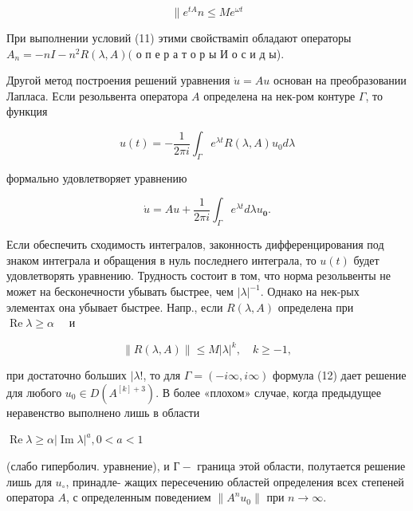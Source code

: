 \documentclass[10pt]{article}
\begin{document}
\[

\| e^{t A} n \leqslant M e^{\omega t}

\]



При выполнении условий (11) этими свойстваміп обладают операторы $A_{n}=-n I-n^{2} R(\lambda, A)($ о п е р а т о р ы И о с и д ы).



Другой метод построения решений уравнения $\dot{u}=A u$ основан на преобразовании Лапласа. Если резольвента оператора $A$ определена на нек-ром контуре $\Gamma$, то функция



\[

u(t)=-\frac{1}{2 \pi i} \int_{\Gamma} e^{\lambda t} R(\lambda, A) u_{0} d \lambda

\]



формально удовлетворяет уравнению



\[

\dot{u}=A u+\frac{1}{2 \pi i} \int_{\Gamma} e^{\lambda t} d \lambda u_{\mathbf{0}} .

\]



Если обеспечить сходимость интегралов, законность дифференцирования под знаком интеграла и обращения в нуль последнего интеграла, то $u(t)$ будет удовлетворять уравнению. Трудность состоит в том, что норма резольвенты не может на бесконечности убывать быстрее, чем $|\lambda|^{-1}$. Однако на нек-рых элементах она убывает быстрее. Напр., если $R(\lambda, A)$ определена при $\operatorname{Re} \lambda \geqslant \alpha \quad$ и



\[

\|R(\lambda, A)\| \leqslant M|\lambda|^{k}, \quad k \geqslant-1,

\]



при достаточно больших $\mid \lambda !$, то для $\Gamma=(-i \infty, i \infty)$ формула (12) дает решение для любого $u_{0} \in D\left(A^{[k]+3}\right)$. В более «плохом» случае, когда предыдущее неравенство выполнено лишь в области



$\operatorname{Re} \lambda \geqslant \alpha|\operatorname{Im} \lambda|^{a}, 0<a<1$



(слабо гиперболич. уравнение), и $Г-$ граница этой области, полутается решение лишь для $u_{\circ}$, принадле- жащих пересечению областей определения всех степеней оператора $A$, с определенным поведением $\left\|A^{n} u_{0}\right\|$ при $n \rightarrow \infty$.
\end{document}

